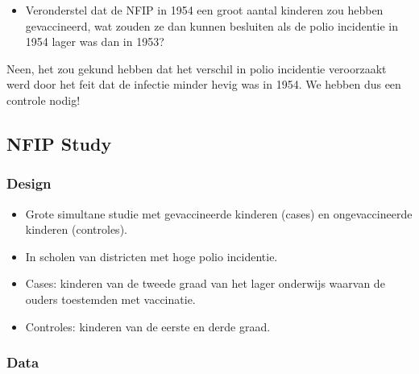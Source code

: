 \documentclass[
  12pt,dutch,coursenotes]{book}
\providecommand{\tightlist}{%
  \setlength{\itemsep}{0pt}\setlength{\parskip}{0pt}}
\theoremstyle{definition}
\theoremstyle{definition}
\theoremstyle{definition}
\theoremstyle{remark}
\begin{document}
\begin{itemize}
\tightlist
\item
  Veronderstel dat de NFIP in 1954 een groot aantal kinderen zou hebben gevaccineerd, wat zouden ze dan kunnen besluiten als de polio incidentie in 1954 lager was dan in 1953?
\end{itemize}

Neen, het zou gekund hebben dat het verschil in polio incidentie veroorzaakt werd door het feit dat de infectie minder hevig was in 1954.
We hebben dus een controle nodig!

\hypertarget{nfip-study}{%
\subsection{NFIP Study}\label{nfip-study}}

\hypertarget{design}{%
\subsubsection{Design}\label{design}}

\begin{itemize}
\tightlist
\item
  Grote simultane studie met gevaccineerde kinderen (cases) en ongevaccineerde kinderen (controles).
\item
  In scholen van districten met hoge polio incidentie.
\item
  Cases: kinderen van de tweede graad van het lager onderwijs waarvan de ouders toestemden met vaccinatie.
\item
  Controles: kinderen van de eerste en derde graad.
\end{itemize}

\hypertarget{data}{%
\subsubsection{Data}\label{data}}
\end{document}
